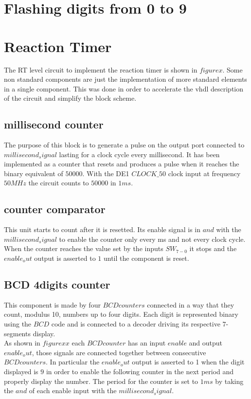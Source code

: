 \documentclass[12pt]{article}
\begin{document}
\section{Flashing digits from 0 to 9}
\section{Reaction Timer}
The RT level circuit to implement the reaction timer is shown in $figure x$. Some non standard components are just the implementation of more standard elements in a single component. This was done in order to accelerate the vhdl description of the circuit and simplify the block scheme.
\subsection{millisecond counter}
The purpose of this block is to generate a pulse on the output port connected to $millisecond_signal$ lasting for a clock cycle every millisecond. It has been implemented as a counter that resets and produces a pulse when it reaches the binary equivalent of $50000$. With the DE1 $CLOCK\_50$ clock input at frequency $50MHz$ the circuit counts to $50000$ in $1ms$.
\subsection{counter comparator}
This unit starts to count after it is resetted. Its enable signal is in $and$ with the $millisecond_signal$ to enable the counter only every ms and not every clock cycle. \\When the counter reaches the value set by the inputs $SW_{7-0}$ it stops and the $enable_out$ output is asserted to $1$ until the component is reset.
\subsection{BCD 4digits counter}
This component is made by four $BCDcounters$ connected in a way that they count, modulus 10, numbers up to four digits. Each digit is represented binary using the $BCD$ code and is connected to a decoder driving its respective 7-segments display. \\
As shown in $figure xx$ each $BCDcounter$ has an input $enable$ and output $enable_out$, those signals are connected together between consecutive $BCDcounters$. In particular the $enable_out$ output is asserted to 1 when the digit displayed is $9$ in order to enable the following counter in the next period and properly display the number. The period for the counter is set to $1ms$ by taking the $and$ of each enable input with the $millisecond_signal$.
\end{document}

